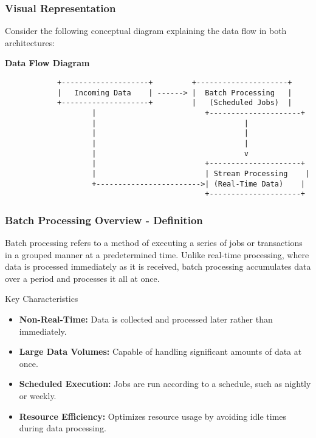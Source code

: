 \documentclass[aspectratio=169]{beamer}
\begin{document}
\begin{frame}[fragile]
    \frametitle{Visual Representation}
    Consider the following conceptual diagram explaining the data flow in both architectures:
    
    \begin{center}
        \textbf{Data Flow Diagram}
        \begin{verbatim}
            +--------------------+         +---------------------+
            |   Incoming Data    | ------> |  Batch Processing   |
            +--------------------+         |   (Scheduled Jobs)  |
                    |                         +---------------------+
                    |                                  |
                    |                                  |
                    |                                  |
                    |                                  v
                    |                         +---------------------+
                    |                         | Stream Processing    |
                    +------------------------>| (Real-Time Data)    |
                                              +---------------------+
        \end{verbatim}
    \end{center}
\end{frame}

\begin{frame}[fragile]
    \frametitle{Batch Processing Overview - Definition}
    Batch processing refers to a method of executing a series of jobs or transactions in a grouped manner at a predetermined time. Unlike real-time processing, where data is processed immediately as it is received, batch processing accumulates data over a period and processes it all at once.

    \begin{block}{Key Characteristics}
        \begin{itemize}
            \item \textbf{Non-Real-Time:} Data is collected and processed later rather than immediately.
            \item \textbf{Large Data Volumes:} Capable of handling significant amounts of data at once.
            \item \textbf{Scheduled Execution:} Jobs are run according to a schedule, such as nightly or weekly.
            \item \textbf{Resource Efficiency:} Optimizes resource usage by avoiding idle times during data processing.
        \end{itemize}
    \end{block}
\end{frame}
\end{document}
